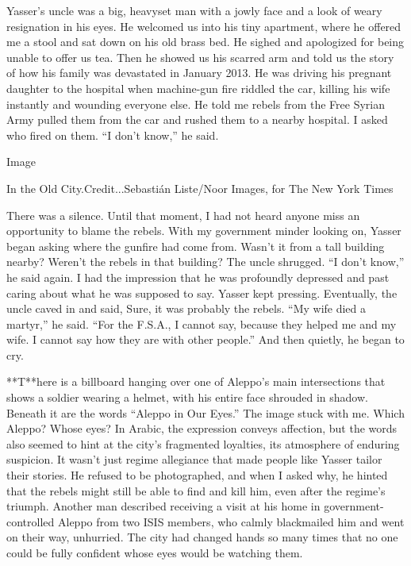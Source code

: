 Yasser's uncle was a big, heavyset man with a jowly face and a look of
weary resignation in his eyes. He welcomed us into his tiny apartment,
where he offered me a stool and sat down on his old brass bed. He sighed
and apologized for being unable to offer us tea. Then he showed us his
scarred arm and told us the story of how his family was devastated in
January 2013. He was driving his pregnant daughter to the hospital when
machine-gun fire riddled the car, killing his wife instantly and
wounding everyone else. He told me rebels from the Free Syrian Army
pulled them from the car and rushed them to a nearby hospital. I asked
who fired on them. ``I don't know,'' he said.

Image

In the Old City.Credit...Sebastián Liste/Noor Images, for The New York
Times

There was a silence. Until that moment, I had not heard anyone miss an
opportunity to blame the rebels. With my government minder looking on,
Yasser began asking where the gunfire had come from. Wasn't it from a
tall building nearby? Weren't the rebels in that building? The uncle
shrugged. ``I don't know,'' he said again. I had the impression that he
was profoundly depressed and past caring about what he was supposed to
say. Yasser kept pressing. Eventually, the uncle caved in and said,
Sure, it was probably the rebels. ``My wife died a martyr,'' he said.
``For the F.S.A., I cannot say, because they helped me and my wife. I
cannot say how they are with other people.'' And then quietly, he began
to cry.

**T**here is a billboard hanging over one of Aleppo's main intersections
that shows a soldier wearing a helmet, with his entire face shrouded in
shadow. Beneath it are the words ``Aleppo in Our Eyes.'' The image stuck
with me. Which Aleppo? Whose eyes? In Arabic, the expression conveys
affection, but the words also seemed to hint at the city's fragmented
loyalties, its atmosphere of enduring suspicion. It wasn't just regime
allegiance that made people like Yasser tailor their stories. He refused
to be photographed, and when I asked why, he hinted that the rebels
might still be able to find and kill him, even after the regime's
triumph. Another man described receiving a visit at his home in
government-controlled Aleppo from two ISIS members, who calmly
blackmailed him and went on their way, unhurried. The city had changed
hands so many times that no one could be fully confident whose eyes
would be watching them.

